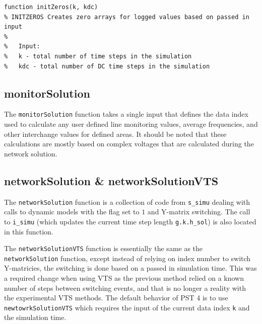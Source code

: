 \vspace{-.5 em}
\begin{lstlisting}[caption={Function Header for initZeros},label={lst: initZeros header}]
\end{lstlisting}\vspace{-2 em}
\begin{verbatim}
function initZeros(k, kdc)
% INITZEROS Creates zero arrays for logged values based on passed in input
%
%   Input:
%   k - total number of time steps in the simulation
%   kdc - total number of DC time steps in the simulation
\end{verbatim}

\subsection{monitorSolution}  
The \verb|monitorSolution| function takes a single input that defines the data index used to calculate any user defined line monitoring values, average frequencies, and other interchange values for defined areas.
It should be noted that these calculations are mostly based on complex voltages that are calculated during the network solution.

\subsection{networkSolution \& networkSolutionVTS}  
The \verb|networkSolution| function is a collection of code from \verb|s_simu| dealing with calls to dynamic models with the flag set to $1$ and Y-matrix switching.
The call to \verb|i_simu| (which updates the current time step length \verb|g.k.h_sol|) is also located in this function.

The \verb|networkSolutionVTS| function is essentially the same as the \verb|networkSolution| function, except instead of relying on index number to switch Y-matricies, the switching is done based on a passed in simulation time.
This was a required change when using VTS as the previous method relied on a known number of steps between switching events, and that is no longer a reality with the experimental VTS methods.
The default behavior of PST 4 is to use \verb|newtowrkSolutionVTS| which requires the input of the current data index \verb|k| and the simulation time.

